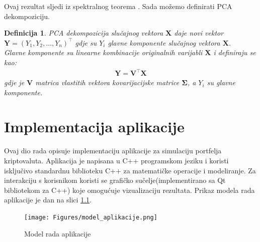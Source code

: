 \documentclass[zavrsnirad]{fer}
\newtheorem{definition}{Definicija}
\begin{document}
\noindent Ovaj rezultat sljedi iz spektralnog teorema \cite{NumerickaLinearna}.
Sada možemo definirati PCA dekompoziciju.
\begin{definition}
    PCA dekompozicija slučajnog vektora $\mathbf{X}$ daje novi vektor
    $\mathbf{Y} = (Y_1, Y_2, \dots, Y_n)^\intercal$ gdje su $Y_i$
    glavne komponente slučajnog vektora $\mathbf{X}$.\\
    Glavne komponente su linearne kombinacije originalnih varijabli
    $\mathbf{X}$ i definiraju se kao:
    \begin{align*}
        \mathbf{Y} = \boldsymbol{V}^\intercal \mathbf{X}
    \end{align*}
    \indent gdje je $\boldsymbol{V}$ matrica vlastitih vektora kovarijacijske
    matrice $\boldsymbol{\Sigma}$, a $Y_i$ su glavne komponente.
\end{definition}




\chapter{Implementacija aplikacije}
\label{pog:implementacija}
Ovaj dio rada opisuje implementaciju aplikacije za simulaciju
portfelja kriptovaluta. Aplikacija je napisana u C++ programskom
jeziku i koristi isključivo standardnu biblioteku C++ za matematičke
operacije i modeliranje. Za interakciju s korisnikom koristi se
grafičko sučelje(implementirano sa Qt bibliotekom za C++) koje
omogućuje vizualizaciju rezultata. Prikaz modela rada aplikacije
je dan na slici \ref{fig:model_aplikacije}.
\\

\begin{figure}[H]
    \centering
    \texttt{[image: Figures/model\_aplikacije.png]}
    \caption{Model rada aplikacije}
    \label{fig:model_aplikacije}
\end{figure}
\end{document}
